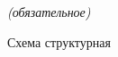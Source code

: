 \label{sec:sec_add_a}


\begin{center}
	\normalfont\normalsize{\textit{(обязательное)}}

	\normalfont\normalsize{Схема структурная}
\end{center}

\clearpage
